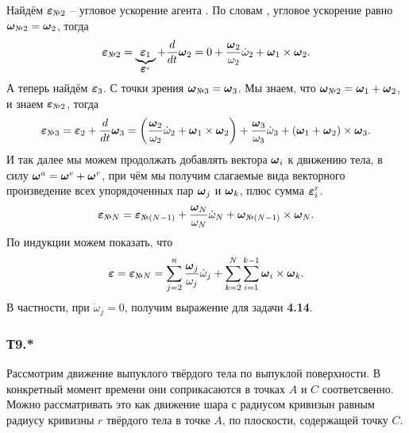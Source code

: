 Найдём $\vc{\varepsilon}_{\text{\textnumero} 2}$ -- угловое ускорение агента . По словам , угловое ускорение равно $\vc{\omega}_{\text{\textnumero 2}} = \vc{\omega}_2$, тогда
$$
    \vc{\varepsilon}_{\text{\textnumero} 2} = \underbrace{\vc{\varepsilon}_1}_{\vc{\varepsilon}^e} + \frac{d}{dt} \vc{\omega}_2 = 0 + 
    \frac{\vc{\omega}_2}{\omega_2} \dot{\omega}_2
    + 
    \vc{\omega}_1 \times \vc{\omega}_2.
$$
А теперь найдём $\mbox{\boldmath $\varepsilon$}_3$. С точки зрения  $\vc{\omega}_{\text{\textnumero 3}} = \vc{\omega}_3$. Мы знаем, что $\vc{\omega}_{\text{\textnumero 2}} = \vc{\omega}_1 + \vc{\omega}_2$, и знаем $\vc{\varepsilon}_{\text{\textnumero} 2}$, тогда
$$
    \vc{\varepsilon}_{\text{\textnumero} 3} = \vc{\varepsilon}_2 + \frac{d}{dt} \vc{\omega}_3 = 
    \left(\frac{\vc{\omega}_2}{\omega_2} \dot{\omega}_2 + \vc{\omega}_1 \times \vc{\omega}_2\right)
    + 
    \frac{\vc{\omega}_3}{\omega_3} \dot{\omega}_3
    + 
    (\vc{\omega}_1 + \vc{\omega}_2) \times \vc{\omega}_3.
$$
И так далее мы можем продолжать добавлять вектора $\mbox{\boldmath $\omega$}_i$ к движению тела, в силу $\mbox{\boldmath $\omega$}^a = \mbox{\boldmath $\omega$}^e + \mbox{\boldmath $\omega$}^r$, при чём мы получим слагаемые вида векторного произведение всех упорядоченных пар $\mbox{\boldmath $\omega$}_j$ и $\mbox{\boldmath $\omega$}_k$, плюс сумма $\mbox{\boldmath $\varepsilon$}^r_i$.
$$
    \vc{\varepsilon}_{\text{\textnumero} N} = \vc{\varepsilon}_{\text{\textnumero} (N-1)} + 
    \frac{\vc{\omega}_N}{\omega_N} \dot{\omega}_N +
    \vc{\omega}_{\text{\textnumero} (N-1)} \times \vc{\omega}_N.
$$
По индукции можем показать, что
$$
    \vc{\varepsilon} = \vc{\varepsilon}_{\text{\textnumero} N} = \sum_{j=2}^n \frac{\vc{\omega}_j}{\omega_j} \dot{\omega}_j + \sum_{k=2}^N \sum_{i=1}^{k-1} \vc{\omega}_i \times \vc{\omega}_k.
$$
В частности, при $\dot{\omega}_j = 0$, получим выражение для задачи \textbf{4.14}.


\subsubsection*{Т9.*}


\begin{figure}
  \begin{center}
  \end{center}
\end{figure}

Рассмотрим движение выпуклого твёрдого тела по выпуклой поверхности. В конкретный момент времени они соприкасаются в точках $A$ и $C$ соответсвенно. Можно рассматривать это как движение шара с радиусом кривизын равным радиусу кривизны $r$ твёрдого тела в точке $A$, по плоскости, содержащей точку $C$. 

